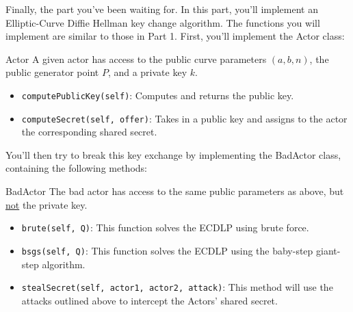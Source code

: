 \documentclass{article}
\begin{document}
\begin{tcolorbox}[enhanced,interior style={top color=Plum!20,bottom color=Plum!30}]
    Finally, the part you've been waiting for. In this part, you'll implement an Elliptic-Curve Diffie Hellman key change algorithm. The functions you will implement are similar to those in Part 1. First, you'll implement the Actor class:

    \begin{mybox}[
        colframe=Cerulean!50!black,
        colback=Cerulean!30,
        colbacktitle=Cerulean!,
        coltitle=Cerulean!30!black
        ]{Actor}
        A given actor has access to the public curve parameters $(a, b, n)$, the public generator point $P$, and a private key $k$.
        \begin{itemize}
            \item \lstinline{computePublicKey(self)}: Computes and returns the public key.
            \item \lstinline{computeSecret(self, offer)}: Takes in a public key and assigns to the actor the corresponding shared secret.
        \end{itemize}

    \end{mybox}

    You'll then try to break this key exchange by implementing the BadActor class, containing the following methods:

    \begin{mybox}[
        colframe=purple!50!black,
        colback=purple!40,
        colbacktitle=purple!50!white,
        coltitle=purple!30!black,
        ]{BadActor}
        The bad actor has access to the same public parameters as above, but \underline{not} the private key.
        \begin{itemize}
            \item \lstinline{brute(self, Q)}: This function solves the ECDLP using brute force.
            \item \lstinline{bsgs(self, Q)}: This function solves the ECDLP using the baby-step giant-step algorithm.
            \item \lstinline{stealSecret(self, actor1, actor2, attack)}: This method will use the attacks outlined above to intercept the Actors' shared secret.
        \end{itemize}
    \end{mybox}
\end{tcolorbox}
\end{document}
